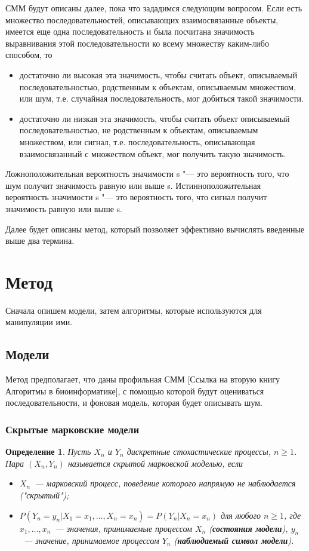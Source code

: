 \documentclass[]{article}
\newtheorem{defenition}{Определение}
\begin{document}
		СММ будут описаны далее, пока что зададимся следующим вопросом. Если есть множество последовательностей, описывающих взаимосвязанные объекты, имеется еще одна последовательность и была посчитана значимость выравнивания этой последовательности ко всему множеству каким-либо способом, то
		\begin{itemize}
			\item достаточно ли высокая эта значимость, чтобы считать объект, описываемый последовательностью, родственным к объектам, описываемым множеством, или шум, т.е. случайная последовательность, мог добиться такой значимости.
			\item достаточно ли низкая эта значимость, чтобы считать объект описываемый последовательностью, не родственным к объектам, описываемым множеством, или сигнал, т.е. последовательность, описывающая взаимосвязанный с множеством объект, мог получить такую значимость. 
		\end{itemize}
		Ложноположительная вероятность значимости s "--- это вероятность того, что шум получит значимость равную или выше s. Истинноположительная вероятность значимости s "--- это вероятность того, что сигнал получит значимость равную или выше s. 
		
		Далее будет описаны метод, который позволяет эффективно вычислять введенные выше два термина.
		
		\section{Метод}
		Сначала опишем модели, затем алгоритмы, которые используются для манипуляции ими.
		\subsection{Модели}
		Метод предполагает, что даны профильная СММ [Ссылка на вторую книгу Алгоритмы в биоинформатике], с помощью которой будут оцениваться последовательности, и фоновая модель, которая будет описывать шум.
		\subsubsection{Скрытые марковские модели}						
			\begin{defenition}
				Пусть $X_{n}$ и $Y_{n}$ дискретные стохастические процессы, $n \geq 1$. Пара $(X_{n}, Y_{n})$ называется скрытой марковской моделью, если
				\begin{itemize}
					\item $X_{n}$~--- марковский процесс, поведение которого напрямую не наблюдается ("скрытый");
					\item $P(Y_{n} = y_{n}|X_{1} = x_{1},\dots, X_{n} = x_{n}) = P(Y_{n}|X_{n}=x_{n})$ для любого $n \geq 1$, где $x_{1},\dots,x_{n}$~--- значения, принимаемые процессом  $X_{n}$ (\textbf{состояния модели}), $ y_{n}$~--- значение, принимаемое процессом $Y_{n}$ (\textbf{наблюдаемый символ модели}).
				\end{itemize}
			\end{defenition}
		
\end{document}
